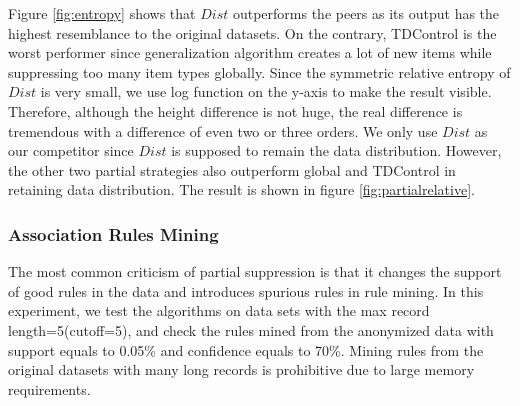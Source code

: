 Figure \ref{fig:entropy} shows that $Dist$ outperforms the peers
 as its output has the highest resemblance
to the original datasets.
On the contrary, TDControl is the worst performer
since generalization algorithm creates a lot of new items while
suppressing too many item types globally.
Since the symmetric relative entropy of $Dist$ is very small, we use log function
on the y-axis to make the result visible. Therefore, although the height difference
is not huge, the real difference is tremendous with a difference of even two or three orders.
We only use $Dist$ as our competitor since $Dist$ is supposed to remain the data distribution.
However, the other two partial strategies also outperform global and TDControl in retaining data distribution.
The result is shown in figure \ref{fig:partialrelative}.


\subsubsection{Association Rules Mining}\label{sec:eval:rulemining}
The most common criticism of partial suppression is that it
changes the support of good rules in the data and introduces spurious
rules in rule mining. In this experiment, we test the algorithms on
data sets with the max record length=5(cutoff=5), and check the rules mined from the anonymized data
with support equals to 0.05\% and confidence equals to 70\%. Mining rules from the original datasets with many
long records is prohibitive due to large memory requirements.

